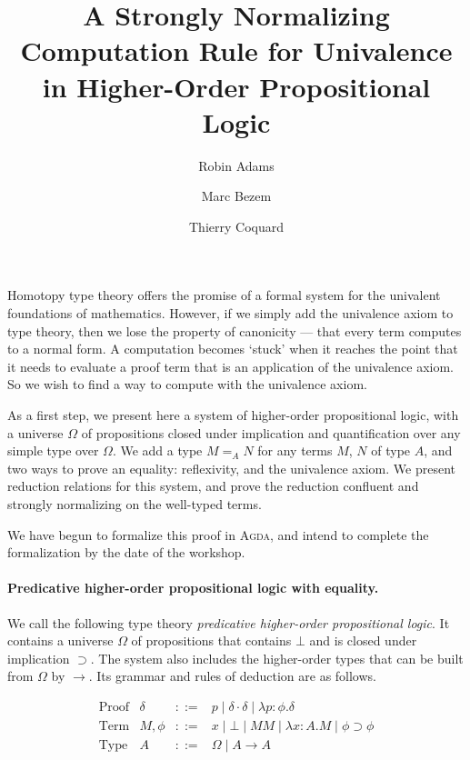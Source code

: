 \documentclass{easychair}
\title{A Strongly Normalizing Computation Rule for Univalence in Higher-Order Propositional Logic}
\author{Robin Adams\inst{1} \and Marc Bezem\inst{1} \and Thierry Coquard\inst{2}}
\institute{Universitetet i Bergen,
Bergen, Norway \\
\email{\{robin.adams,marc\}@uib.no}
\and
University of Gothenburg,
Gothenburg, Sweden \\
\email{coquand@chalmers.se}}
\begin{document}
\maketitle

Homotopy type theory offers the promise of a formal system for the univalent foundations of mathematics.  However, if
we simply add the univalence axiom to type theory, then we lose the property of canonicity --- that every term computes to
a normal form.  A computation becomes `stuck' when it reaches the point that it needs to evaluate a proof term
that is an application of the univalence axiom.  So we wish to find a way to compute with the univalence axiom.

As a first step, we present here a system of higher-order propositional logic,  with a universe $\Omega$ of propositions
closed under implication and quantification over any simple type over $\Omega$.  We add a type $M =_A N$ for any terms $M$, $N$ of type $A$,
and two ways to prove an equality: reflexivity, and the univalence axiom.  We present reduction relations for this system, and prove the reduction confluent and strongly normalizing
on the well-typed terms.

We have begun to formalize this proof in \textsc{Agda}, and intend to complete the formalization by the date of the workshop.

\paragraph{Predicative higher-order propositional logic with equality.}

We call the following type theory \emph{predicative higher-order propositional logic}.  It contains a universe $\Omega$ of propositions that contains $\bot$ and
is closed under implication $\supset$.  The system also includes the higher-order types that can be built from $\Omega$ by $\rightarrow$.  Its grammar and rules of deduction are as follows.

\[ \begin{array}{lrcl}
\text{Proof} & \delta & ::= & p \mid \delta \cdot \delta \mid \lambda p : \phi . \delta \\
\text{Term} & M, \phi & ::= & x \mid \bot \mid M M \mid \lambda x : A . M \mid \phi \supset \phi \\
\text{Type} & A & ::= & \Omega \mid A \rightarrow A \\
\end{array} \]
\end{document}
